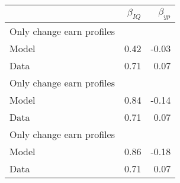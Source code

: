 \begin{tabular}{lrr}
\hline
  & $\beta_{IQ}$  & $\beta_{yp}$  \\
\hline
Only change earn profiles &   &   \\
Model & 0.42  & -0.03  \\
Data & 0.71  & 0.07  \\
Only change earn profiles &   &   \\
Model & 0.84  & -0.14  \\
Data & 0.71  & 0.07  \\
Only change earn profiles &   &   \\
Model & 0.86  & -0.18  \\
Data & 0.71  & 0.07  \\
\hline
\end{tabular}%
